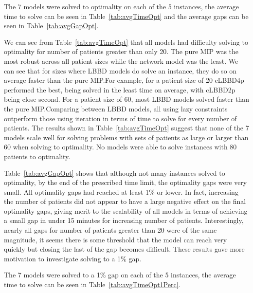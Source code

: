 The 7 models were solved to optimality on each of the 5 instances, the average time to solve can be seen in Table~\ref{tab:avgTimeOpt} and the average gaps can be seen in Table~\ref{tab:avgGapOpt}.



We can see from Table~\ref{tab:avgTimeOpt} that all models had difficulty solving to optimality for number of patients greater than only 20. The pure MIP was the most robust across all patient sizes while the network model was the least. We can see that for sizes where LBBD models do solve an instance, they do so on average faster than the pure MIP.\@ For example, for a patient size of 20 cLBBD4p performed the best, being solved in the least time on average, with cLBBD2p being close second. For a patient size of 60, most LBBD models solved faster than the pure MIP.\@ Comparing between LBBD models, all using lazy constraints outperform those using iteration in terms of time to solve for every number of patients. The results shown in Table~\ref{tab:avgTimeOpt} suggest that none of the 7 models scale well for solving problems with sets of patients as large or larger than 60 when solving to optimality. No models were able to solve instances with 80 patients to optimality. 



Table~\ref{tab:avgGapOpt} shows that although not many instances solved to optimality, by the end of the prescribed time limit, the optimality gaps were very small. All optimality gaps had reached at least 1\% or lower. In fact, increasing the number of patients did not appear to have a large negative effect on the final optimality gaps, giving merit to the scalability of all models in terms of achieving a small gap in under 15 minutes for increasing number of patients. Interestingly, nearly all gaps for number of patients greater than 20 were of the same magnitude, it seems there is some threshold that the model can reach very quickly but closing the last of the gap becomes difficult. These results gave more motivation to investigate solving to a 1\% gap.

The 7 models were solved to a 1\% gap on each of the 5 instances, the average time to solve can be seen in Table~\ref{tab:avgTimeOpt1Perc}.


%  

